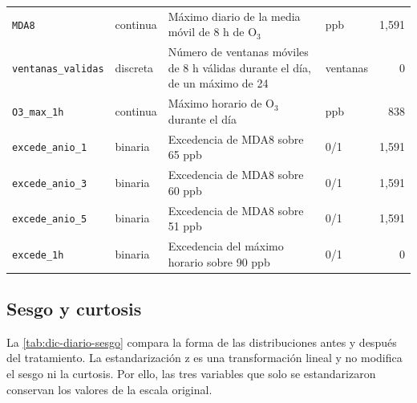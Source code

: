 \begin{table}[pos=t]
\begin{tabular}{llp{8.0cm}lr}
    \texttt{MDA8} & continua & Máximo diario de la media móvil de 8 h de O$_3$
      & ppb & 1,591 \\
    \texttt{ventanas\_validas} & discreta & Número de ventanas móviles de 8 h válidas
      durante el día, de un máximo de 24 & ventanas & 0 \\
    \texttt{O3\_max\_1h} & continua & Máximo horario de O$_3$ durante el día
      & ppb & 838 \\
    \texttt{excede\_anio\_1} & binaria & Excedencia de MDA8 sobre 65 ppb
      & 0/1 & 1,591 \\
    \texttt{excede\_anio\_3} & binaria & Excedencia de MDA8 sobre 60 ppb
      & 0/1 & 1,591 \\
    \texttt{excede\_anio\_5} & binaria & Excedencia de MDA8 sobre 51 ppb
      & 0/1 & 1,591 \\
    \texttt{excede\_1h} & binaria & Excedencia del máximo horario sobre 90 ppb
      & 0/1 & 0 \\
    \bottomrule
  \end{tabular}
\end{table}

\subsection{Sesgo y curtosis}
La \cref{tab:dic-diario-sesgo} compara la forma de las distribuciones antes y
después del tratamiento. La estandarización z es una transformación lineal y no
modifica el sesgo ni la curtosis. Por ello, las tres variables que solo se
estandarizaron conservan los valores de la escala original.

